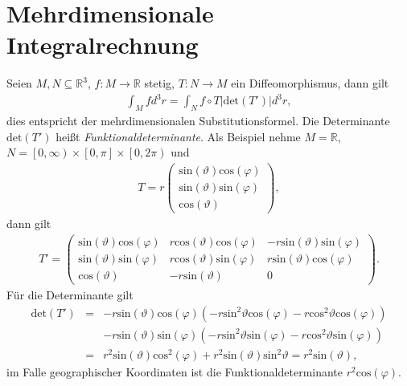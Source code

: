 \documentclass{book}
\renewcommand{\sin}{\text{sin}}
\renewcommand{\cos}{\text{cos}}
\renewcommand{\det}{\text{det}}
\begin{document}
\section{Mehrdimensionale Integralrechnung}
\label{sec:mehrdimensionale_integralrechnung}

Seien $M, N\subseteq\mathbb{R}^3$, $f:M\to\mathbb{R}$ stetig, $T:N\to M$ ein Diffeomorphismus, dann gilt
%
\begin{eqnarray}
\int_{M}^{}fd^3r = \int_{N}^{}f\circ T\left|\det\left(T'\right)\right|d^3r, \label{eq:trans_formel}
\end{eqnarray}
%
dies entspricht der mehrdimensionalen Substitutionsformel. Die Determinante $\det\left(T'\right)$ heißt \textit{Funktionaldeterminante}. Als Beispiel nehme $M = \mathbb{R}$, $N = \left[0, \infty\right)\times\left[0, \pi\right]\times\left[0, 2\pi\right)$ und
%
\begin{eqnarray}
T = r\left(\begin{array}{c}
\sin\left(\vartheta\right)\cos\left(\varphi\right)\\
\sin\left(\vartheta\right)\sin\left(\varphi\right)\\
\cos\left(\vartheta\right)
\end{array}\right), 
\end{eqnarray}
%
dann gilt
%
\begin{eqnarray}
T' = \left(\begin{array}{ccc}
\sin\left(\vartheta\right)\cos\left(\varphi\right)&r\cos\left(\vartheta\right)\cos\left(\varphi\right)& -r\sin\left(\vartheta\right)\sin\left(\varphi\right)\\
\sin\left(\vartheta\right)\sin\left(\varphi\right)&r\cos\left(\vartheta\right)\sin\left(\varphi\right)&r\sin\left(\vartheta\right)\cos\left(\varphi\right)\\
\cos\left(\vartheta\right)& -r\sin\left(\vartheta\right)&0
\end{array}\right).
\end{eqnarray}
%
Für die Determinante gilt
%
\begin{eqnarray}
\det\left(T'\right) & = & -r\sin\left(\vartheta\right)\cos\left(\varphi\right)\left(-r\sin^2\vartheta\cos\left(\varphi\right) - r\cos^2\vartheta\cos\left(\varphi\right)\right)\nonumber\\
&&- r\sin\left(\vartheta\right)\sin\left(\varphi\right)\left(-r\sin^2\vartheta\sin\left(\varphi\right) - r\cos^2\vartheta\sin\left(\varphi\right)\right)\nonumber\\
& = & r^2\sin\left(\vartheta\right)\cos^2\left(\varphi\right) + r^2\sin\left(\vartheta\right)\sin^2\vartheta = r^2\sin\left(\vartheta\right), 
\end{eqnarray}
%
im Falle geographischer Koordinaten ist die Funktionaldeterminante $r^2\cos\left(\varphi\right)$.
\end{document}
